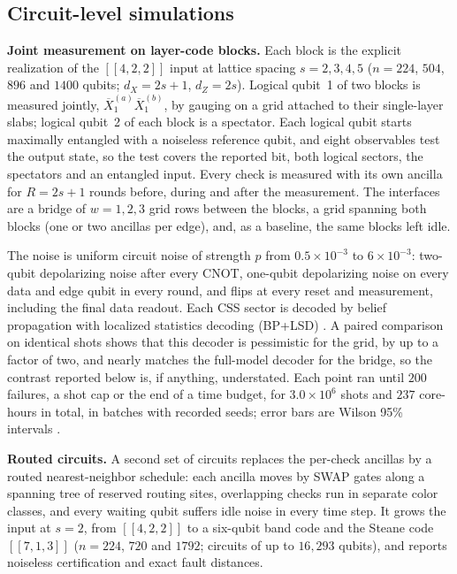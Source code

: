 \documentclass[10pt,a4paper,twocolumn]{article}
\begin{document}
\subsection{Circuit-level simulations}
\label{sec:sim-methods}
\textbf{Joint measurement on layer-code blocks.}  Each block is the explicit
realization of the $[[4,2,2]]$ input at lattice spacing $s=2,3,4,5$ ($n=224$,
$504$, $896$ and $1400$ qubits; $d_X=2s+1$, $d_Z=2s$).  Logical qubit~1 of two
blocks is measured jointly, $\overline X_1^{(a)}\overline X_1^{(b)}$, by gauging
on a grid attached to their single-layer slabs; logical qubit~2 of each block is
a spectator.  Each logical qubit starts maximally entangled with a noiseless
reference qubit, and eight observables test the output state, so the test covers
the reported bit, both logical sectors, the spectators and an entangled input.
Every check is measured with its own ancilla for $R=2s+1$ rounds before, during
and after the measurement.  The interfaces are a bridge of $w=1,2,3$ grid rows
between the blocks, a grid spanning both blocks (one or two ancillas per edge),
and, as a baseline, the same blocks left idle.

The noise is uniform circuit noise of strength $p$ from $0.5\times10^{-3}$ to
$6\times10^{-3}$: two-qubit depolarizing noise after every CNOT, one-qubit
depolarizing noise on every data and edge qubit in every round, and flips at
every reset and measurement, including the final data readout.  Each CSS sector
is decoded by belief propagation with localized statistics decoding (BP+LSD)
\cite{LSD}.  A paired comparison on identical shots shows that this decoder is
pessimistic for the grid, by up to a factor of two, and nearly matches the
full-model decoder for the bridge, so the contrast reported below is, if
anything, understated.  Each point ran until $200$ failures, a shot cap or the
end of a time budget, for $3.0\times10^6$ shots and $237$ core-hours in total,
in batches with recorded seeds; error bars are Wilson 95\% intervals
\cite{Wilson}.

\textbf{Routed circuits.}  A second set of circuits replaces the per-check
ancillas by a routed nearest-neighbor schedule: each ancilla moves by SWAP gates
along a spanning tree of reserved routing sites, overlapping checks run in
separate color classes, and every waiting qubit suffers idle noise in every time
step.  It grows the input at $s=2$, from $[[4,2,2]]$ to a six-qubit band code and
the Steane code $[[7,1,3]]$ ($n=224$, $720$ and $1792$; circuits of up to
$16{,}293$ qubits), and reports noiseless certification and exact fault
distances.
\end{document}
